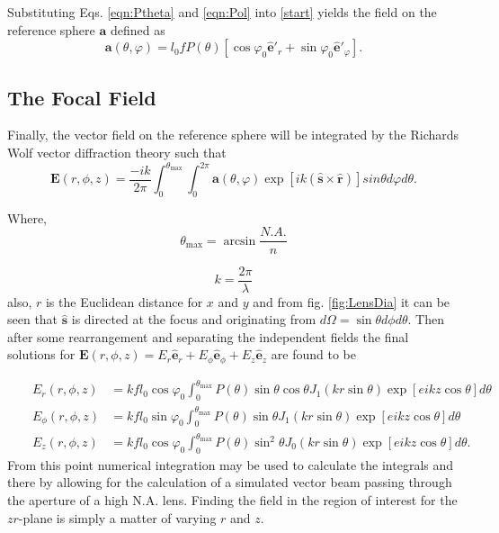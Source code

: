 \documentclass[12pt,a4paper]{article}
\begin{document}
Substituting Eqs. \ref{eqn:Ptheta} and \ref{eqn:Pol} into \ref{start} yields the field on the reference sphere $\textbf{a}$ defined as
\begin{equation}
\textbf{a}(\theta, \varphi) = l_0fP(\theta)[\cos\varphi_0 \hat{\textbf{e}}'_r + \sin\varphi_0 \hat{\textbf{e}}'_\varphi].
\end{equation}

\subsection{The Focal Field}
Finally, the vector field on the reference sphere will be integrated by the Richards Wolf vector diffraction theory such that
\begin{equation}
\textbf{E}(r, \phi, z) = \dfrac{-ik}{2\pi} \int_{0}^{\theta_\text{max}} \int_{0}^{2\pi} \textbf{a}(\theta, \varphi)\exp[ik(\hat{\textbf{s}}\times\hat{\textbf{r}})]sin\theta d \varphi d \theta.
\end{equation}

Where, 
\begin{equation}
\label{eqn:NA}
\theta_\text{max}= \arcsin\dfrac{N.A.}{n}
\end{equation}

\begin{equation}
\label{eqn:k}
k = \dfrac{2\pi}{\lambda}
\end{equation}
also, $r$ is the Euclidean distance for $x$ and $y$ and from fig. \ref{fig:LensDia} it can be seen that $\hat{\textbf{s}}$ is directed at the focus and originating from $d\Omega = \sin\theta d\phi d\theta$. Then after some rearrangement and separating the independent fields the final solutions for $\textbf{E}(r,\phi, z) = E_r \hat{\textbf{e}}_r + E_\phi \hat{\textbf{e}}_\phi + E_z \hat{\textbf{e}}_z$ are found to be

\begin{equation}
\label{eqn:integrals}
    \begin{aligned}
        & & E_{r}(r,\phi,z) &=  kfl_0\cos\varphi_0\int_{0}^{\theta_\text{max}} P(\theta)\sin\theta \cos\theta J_1(kr\sin\theta)\exp[eikz\cos\theta]d\theta \\
     	& & E_{\phi}(r,\phi,z) &= kfl_0\sin\varphi_0\int_{0}^{\theta_\text{max}} P(\theta)\sin\theta J_1(kr\sin\theta)\exp[eikz\cos\theta]d\theta \\
    	& & E_{z}(r,\phi,z) &= kfl_0\cos\varphi_0\int_{0}^{\theta_\text{max}} P(\theta)\sin^2\theta J_0(kr\sin\theta)\exp[eikz\cos\theta]d\theta.
    \end{aligned}
\end{equation}
From this point numerical integration may be used to calculate the integrals and there by allowing for the calculation of a simulated vector beam passing through the aperture of a high N.A. lens. Finding the field in the region of interest for the $zr$-plane is simply a matter of varying $r$ and $z$.
\end{document}
